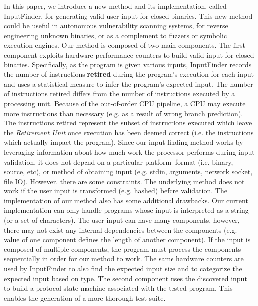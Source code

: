 \documentclass{sig-alternate-05-2015}
\def \tool {InputFinder}
\begin{document}
In this paper, we introduce a new method and its implementation, called InputFinder, for generating valid user-input for closed binaries. 
This new method could be useful in autonomous vulnerability scanning systems, for reverse engineering unknown binaries, or as a complement to fuzzers or symbolic execution engines.
Our method is composed of two main components.
The first component exploits hardware performance counters to build valid input for closed binaries.
Specifically, as the program is given various inputs, \tool{} records the number of instructions \textbf{retired} during the program's execution for each input and uses a statistical measure to infer the program's expected input.
The number of instructions retired differs from the number of instructions executed by a processing unit.
Because of the out-of-order CPU pipeline, a CPU may execute more instructions than necessary (e.g. as a result of wrong branch prediction).
The instructions retired represent the subset of instructions executed which leave the \textit{Retirement Unit} once execution has been deemed correct (i.e. the instructions which actually impact the program).
Since our input finding method works by leveraging information about how much work the processor performs during input validation, it does not depend on a particular platform, format (i.e. binary, source, etc), or method of obtaining input (e.g. stdin, arguments, network socket, file IO).
However, there are some constraints.
The underlying method does not work if the user input is transformed (e.g. hashed) before validation. 
The implementation of our method also has some additional drawbacks.
Our current implementation can only handle programs whose input is interpreted as a string (or a set of characters).
The user input can have many components, however, there may not exist any internal dependencies between the components (e.g. value of one component defines the length of another component).
If the input is composed of multiple components, the program must process the components sequentially in order for our method to work.
The same hardware counters are used by \tool{} to also find the expected input size and to categorize the expected input based on type.
The second component uses the discovered input to build a protocol state machine associated with the tested program.
This enables the generation of a more thorough test suite.
\end{document}
